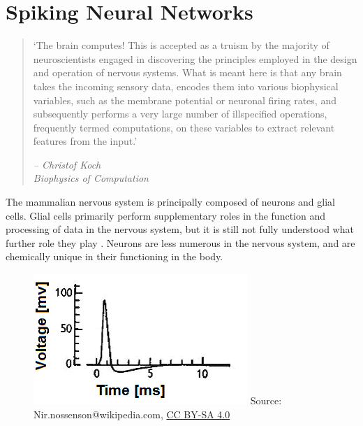 \section{Spiking Neural Networks}

\begin{quote}
    `The brain computes! This is accepted as a truism by the majority
    of neuroscientists engaged in discovering the principles employed in the
    design and operation of nervous systems. What is meant here is that any
    brain takes the incoming sensory data, encodes them into various biophysical
    variables, such as the membrane potential or neuronal firing rates, and
    subsequently performs a very large number of illspecified operations,
    frequently termed computations, on these variables to extract relevant
    features from the input.'
    \begin{flushright}
        \textit{-- Christof Koch \\ Biophysics of Computation}
    \end{flushright}
\end{quote}

The mammalian nervous system is principally composed of neurons and glial cells.
Glial cells primarily perform supplementary roles in the function and processing
of data in the nervous system, but it is still not fully understood what further
role they play \autocite{walz_role_1989}. Neurons are less numerous in the
nervous system, and are chemically unique in their functioning in the body.

\begin{figure}[h]
    \centering
    \includegraphics{figures/graphs/huxhog_spike.png}
    {\small{Source: Nir.nossenson@wikipedia.com,
            \href{https://creativecommons.org/licenses/by-sa/4.0/deed.en}{CC BY-SA 4.0}}}
    \label{neuronalactionpotentialexample}
\end{figure}
\vspace{1ex}

